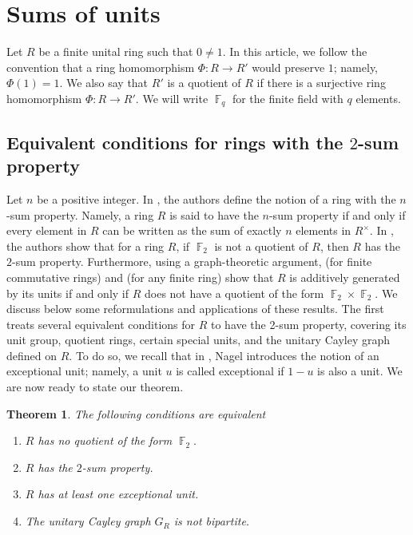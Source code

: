 \documentclass[11pt, a4paper]{amsart}
\newtheorem{thm}{Theorem}[section]
\theoremstyle{definition}
\DeclareMathOperator{\F}{\mathbb{F}}
\numberwithin{equation}{section}
\begin{document}
\section{Sums of units} \label{sec:sum_units}
Let $R$ be a finite unital ring such that $0 \neq 1.$ In this article, we follow the convention that a ring homomorphism $\Phi: R \to R'$ would preserve $1$; namely, $\Phi(1)=1.$ We also say that $R'$ is a quotient of $R$ if there is a surjective ring homomorphism $\Phi: R \to R'.$ We will write $\F_q$ for the finite field with $q$ elements. 

\subsection{Equivalent conditions for rings with the $2$-sum property}

Let  $n$ be a positive integer.  In \cite{goldsmith1998unit}, the authors define the notion of a ring with the $n$-sum property. Namely, a ring $R$ is said to have the $n$-sum property if and only if every element in $R$ can be written as the sum of exactly $n$ elements in $R^{\times}.$  In \cite{unitary, goldsmith1998unit, maimani2010rings, nguyengcd2026}, the authors show that for a ring $R$, if $\F_2$ is not a quotient of $R$, then $R$ has the $2$-sum property.  Furthermore, using a graph-theoretic argument, \cite{maimani2010rings} (for finite commutative rings) and \cite{nguyen2026supercharacters} (for any finite ring) show that $R$ is additively generated by its units if and only if $R$ does not have a quotient of the form $\F_2 \times \F_2.$ We discuss below some reformulations and applications of these results. The first treats several equivalent conditions for $R$ to have the 2-sum property, covering its unit group, quotient rings, certain special units, and the unitary Cayley graph defined on $R$. To do so, we recall that in \cite{nagell1970type}, Nagel introduces the notion of an exceptional unit; namely, a unit $u$ is called exceptional if $1-u$ is also a unit.  We are now ready to state our theorem. 
\begin{thm} \label{thm:main-conditions}
The following conditions are equivalent 
\begin{enumerate}
\item $R$ has no quotient of the form $\F_2.$
    \item $R$ has the $2$-sum property. 
    \item $R$ has at least one exceptional unit. 
    \item The unitary Cayley graph $G_{R}$ is not bipartite. 
\end{enumerate}
\end{thm}
\end{document}
